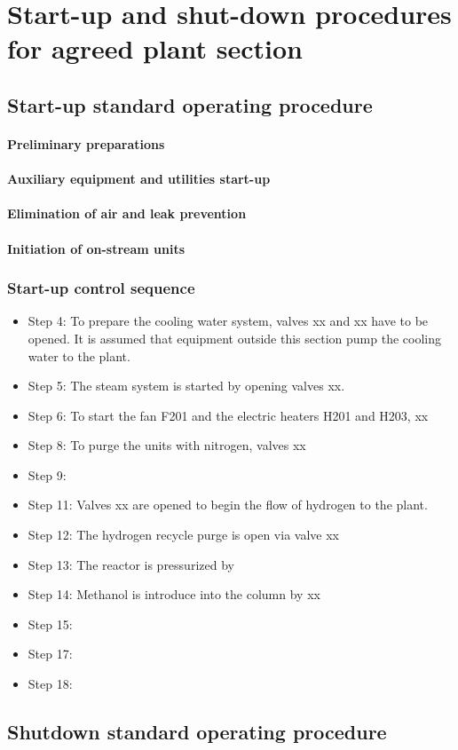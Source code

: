 \section{Start-up and shut-down procedures for agreed plant section}

\subsection{Start-up standard operating procedure}

\paragraph{Preliminary preparations}

\paragraph{Auxiliary equipment and utilities start-up}

\paragraph{Elimination of air and leak prevention}

\paragraph{Initiation of on-stream units}



\subsubsection{Start-up control sequence}


\begin{itemize}
    \item Step 4: To prepare the cooling water system, valves xx and xx have to be opened. It is assumed that equipment outside this section pump the cooling water to the plant.
    \item Step 5: The steam system is started by opening valves xx.
    \item Step 6: To start the fan F201 and the electric heaters H201 and H203, xx
    \item Step 8: To purge the units with nitrogen, valves xx
    \item Step 9: 
    \item Step 11: Valves xx are opened to begin the flow of hydrogen to the plant.
    \item Step 12: The hydrogen recycle purge is open via valve xx
    \item Step 13: The reactor is pressurized by
    \item Step 14: Methanol is introduce into the column by xx
    \item Step 15:
    \item Step 17:
    \item Step 18:
\end{itemize}


\subsection{Shutdown standard operating procedure}